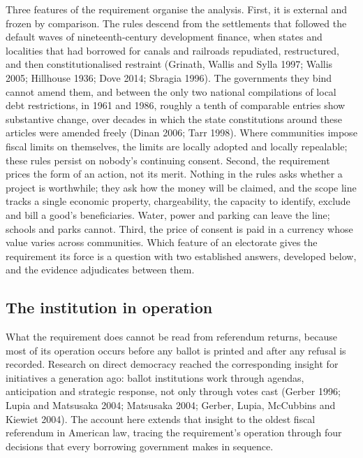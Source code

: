 Three features of the requirement organise the analysis. First, it is external and frozen by comparison. The rules descend from the settlements that followed the default waves of nineteenth-century development finance, when states and localities that had borrowed for canals and railroads repudiated, restructured, and then constitutionalised restraint (Grinath, Wallis and Sylla 1997; Wallis 2005; Hillhouse 1936; Dove 2014; Sbragia 1996). The governments they bind cannot amend them, and between the only two national compilations of local debt restrictions, in 1961 and 1986, roughly a tenth of comparable entries show substantive change, over decades in which the state constitutions around these articles were amended freely (Dinan 2006; Tarr 1998). Where communities impose fiscal limits on themselves, the limits are locally adopted and locally repealable; these rules persist on nobody's continuing consent. Second, the requirement prices the form of an action, not its merit. Nothing in the rules asks whether a project is worthwhile; they ask how the money will be claimed, and the scope line tracks a single economic property, chargeability, the capacity to identify, exclude and bill a good's beneficiaries. Water, power and parking can leave the line; schools and parks cannot. Third, the price of consent is paid in a currency whose value varies across communities. Which feature of an electorate gives the requirement its force is a question with two established answers, developed below, and the evidence adjudicates between them.

\subsection{The institution in operation}
What the requirement does cannot be read from referendum returns, because most of its operation occurs before any ballot is printed and after any refusal is recorded. Research on direct democracy reached the corresponding insight for initiatives a generation ago: ballot institutions work through agendas, anticipation and strategic response, not only through votes cast (Gerber 1996; Lupia and Matsusaka 2004; Matsusaka 2004; Gerber, Lupia, McCubbins and Kiewiet 2004). The account here extends that insight to the oldest fiscal referendum in American law, tracing the requirement's operation through four decisions that every borrowing government makes in sequence.

